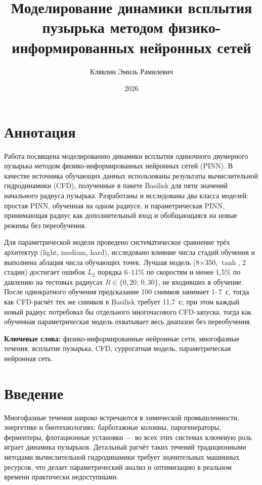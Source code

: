\documentclass[12pt,a4paper]{article}
\title{Моделирование динамики всплытия пузырька методом физико-информированных нейронных сетей}
\author{Клявлин Эмиль Рамилевич}
\date{2026}
\begin{document}
\maketitle

\newpage
\tableofcontents
\newpage

\section*{Аннотация}

Работа посвящена моделированию динамики всплытия одиночного двумерного пузырька
методом физико-информированных нейронных сетей (PINN). В качестве источника
обучающих данных использованы результаты вычислительной гидродинамики (CFD),
полученные в пакете Basilisk для пяти значений начального радиуса пузырька.
Разработаны и исследованы два класса моделей: простая PINN, обученная на одном
радиусе, и параметрическая PINN, принимающая радиус как дополнительный вход и
обобщающаяся на новые режимы без переобучения.

Для параметрической модели проведено систематическое сравнение трёх архитектур
(light, medium, hard), исследовано влияние числа стадий обучения и выполнена
аблация числа обучающих точек. Лучшая модель (8$\times$350, $\tanh$, 2 стадии)
достигает ошибок $L_2$ порядка 6--11\% по скоростям и менее 1{,}5\% по давлению на
тестовых радиусах $R\in\{0{,}20;\,0{,}30\}$, не входивших в обучение.
После однократного обучения предсказание 100 снимков занимает 1--7~с,
тогда как CFD-расчёт тех же снимков в Basilisk требует 11{,}7~с;
при этом каждый новый радиус потребовал бы отдельного многочасового CFD-запуска,
тогда как обученная параметрическая модель охватывает весь диапазон без переобучения.

\bigskip
\noindent\textbf{Ключевые слова:} физико-информированные нейронные сети,
многофазные течения, всплытие пузырька, CFD, суррогатная модель,
параметрическая нейронная сеть.

\newpage

\section*{Введение}


Многофазные течения широко встречаются в химической промышленности, энергетике
и биотехнологиях: барботажные колонны, парогенераторы, ферментеры, флотационные
установки --- во всех этих системах ключевую роль играет динамика пузырьков.
Детальный расчёт таких течений традиционными методами вычислительной
гидродинамики требует значительных машинных ресурсов, что делает
параметрический анализ и оптимизацию в реальном времени практически недоступными.
\end{document}
